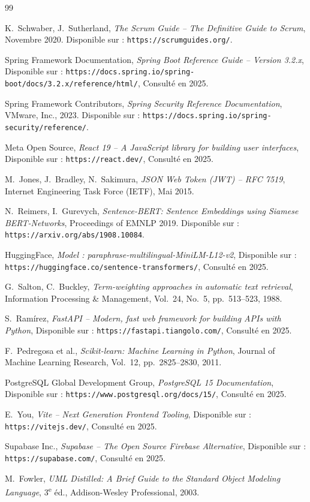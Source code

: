 \documentclass[12pt,a4paper]{report}
\begin{document}
\begin{thebibliography}{99}

K.~Schwaber, J.~Sutherland, \textit{The Scrum Guide -- The Definitive Guide to Scrum},
Novembre 2020. Disponible sur : \texttt{https://scrumguides.org/}.

Spring Framework Documentation, \textit{Spring Boot Reference Guide -- Version 3.2.x},
Disponible sur : \texttt{https://docs.spring.io/spring-boot/docs/3.2.x/reference/html/},
Consulté en 2025.

Spring Framework Contributors, \textit{Spring Security Reference Documentation},
VMware, Inc., 2023. Disponible sur : \texttt{https://docs.spring.io/spring-security/reference/}.

Meta Open Source, \textit{React 19 -- A JavaScript library for building user interfaces},
Disponible sur : \texttt{https://react.dev/}, Consulté en 2025.

M.~Jones, J.~Bradley, N.~Sakimura, \textit{JSON Web Token (JWT) -- RFC 7519},
Internet Engineering Task Force (IETF), Mai 2015.

N.~Reimers, I.~Gurevych, \textit{Sentence-BERT: Sentence Embeddings using Siamese BERT-Networks},
Proceedings of EMNLP 2019. Disponible sur : \texttt{https://arxiv.org/abs/1908.10084}.

HuggingFace, \textit{Model : paraphrase-multilingual-MiniLM-L12-v2},
Disponible sur : \texttt{https://huggingface.co/sentence-transformers/}, Consulté en 2025.

G.~Salton, C.~Buckley, \textit{Term-weighting approaches in automatic text retrieval},
Information Processing \& Management, Vol.~24, No.~5, pp.~513--523, 1988.

S.~Ramírez, \textit{FastAPI -- Modern, fast web framework for building APIs with Python},
Disponible sur : \texttt{https://fastapi.tiangolo.com/}, Consulté en 2025.

F.~Pedregosa et al., \textit{Scikit-learn: Machine Learning in Python},
Journal of Machine Learning Research, Vol.~12, pp.~2825--2830, 2011.

PostgreSQL Global Development Group, \textit{PostgreSQL 15 Documentation},
Disponible sur : \texttt{https://www.postgresql.org/docs/15/}, Consulté en 2025.

E.~You, \textit{Vite -- Next Generation Frontend Tooling},
Disponible sur : \texttt{https://vitejs.dev/}, Consulté en 2025.

Supabase Inc., \textit{Supabase -- The Open Source Firebase Alternative},
Disponible sur : \texttt{https://supabase.com/}, Consulté en 2025.

M.~Fowler, \textit{UML Distilled: A Brief Guide to the Standard Object Modeling Language},
3\textsuperscript{e} éd., Addison-Wesley Professional, 2003.

\end{thebibliography}
\end{document}
